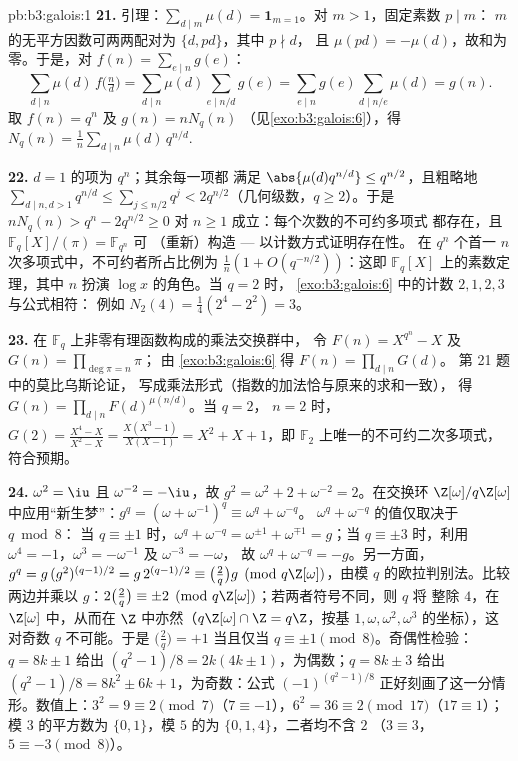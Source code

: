 \begin{solution}{pb:b3:galois:1}
\textbf{21.} 引理：$\sum_{d \mid m}\mu(d) = \mathbf
1_{m=1}$。对 $m > 1$，固定素数 $p \mid m$：
$m$ 的无平方因数可两两配对为 $\{d, pd\}$，其中 $p \nmid d$，
且 $\mu(pd) = -\mu(d)$，故和为零。于是，对 $f(n) =
\sum_{e\mid n}g(e)$：
\[
\sum_{d \mid n}\mu(d)\,f\bigl(\tfrac nd\bigr)
= \sum_{d \mid n}\mu(d)\!\!\sum_{e \mid n/d}\!\!g(e)
= \sum_{e \mid n}g(e)\!\!\sum_{d \mid n/e}\!\!\mu(d)
= g(n) .
\]
取 $f(n) = q^n$ 及 $g(n) = nN_q(n)$
（见\cref{exo:b3:galois:6}），得 $N_q(n) =
\frac1n\sum_{d\mid n}\mu(d)\,q^{n/d}$.

\textbf{22.} $d = 1$ 的项为 $q^n$；其余每一项都
满足 $\abs{\mu(d)q^{n/d}} \leq q^{n/2}$，且粗略地
$\sum_{d \mid n, d > 1}q^{n/d} \leq \sum_{j \leq
n/2}q^j < 2q^{n/2}$（几何级数，$q \geq 2$）。于是 $nN_q(n) >
q^n - 2q^{n/2} \geq 0$ 对 $n \geq 1$ 成立：每个次数的不可约多项式
都存在，且 $\mathbb F_q[X]/(\pi) = \mathbb F_{q^n}$ 可
（重新）构造 --- 以计数方式证明存在性。
在 $q^n$ 个首一 $n$ 次多项式中，不可约者所占比例为
$\frac1n(1 + O(q^{-n/2}))$：这即
$\mathbb F_q[X]$ 上的素数定理，其中 $n$ 扮演 $\log x$ 的角色。当 $q = 2$ 时，
\cref{exo:b3:galois:6} 中的计数 $2, 1, 2, 3$ 与公式相符：
例如 $N_2(4) = \frac14(2^4 - 2^2) = 3$。

\textbf{23.} 在 $\mathbb F_q$ 上非零有理函数构成的乘法交换群中，
令 $F(n) = X^{q^n} -
X$ 及 $G(n) = \prod_{\deg\pi = n}\pi$；
由 \cref{exo:b3:galois:6} 得 $F(n) = \prod_{d\mid n}G(d)$。
第 21 题中的莫比乌斯论证，
写成乘法形式（指数的加法恰与原来的求和一致），
得 $G(n) = \prod_{d \mid n}F(d)^{\mu(n/d)}$。当 $q = 2$，
$n = 2$ 时，$G(2) = \frac{X^4 - X}{X^2 - X} = \frac{X(X^3 -
1)}{X(X - 1)} = X^2 + X + 1$，即
$\mathbb F_2$ 上唯一的不可约二次多项式，符合预期。

\textbf{24.} $\omega^2 = \iu$ 且 $\omega^{-2} = -\iu$，故
$g^2 = \omega^2 + 2 + \omega^{-2} = 2$。在交换环
$\Z[\omega]/q\Z[\omega]$ 中应用“新生梦”：$g^q =
(\omega + \omega^{-1})^q \equiv \omega^q + \omega^{-q}$。
$\omega^q + \omega^{-q}$ 的值仅取决于 $q \bmod 8$：
当 $q \equiv \pm1$ 时，$\omega^q + \omega^{-q} = \omega^{\pm1} +
\omega^{\mp1} = g$；当 $q \equiv \pm3$ 时，利用 $\omega^4 =
-1$，$\omega^{3} = -\omega^{-1}$ 及 $\omega^{-3} = -\omega$，
故 $\omega^q + \omega^{-q} = -g$。另一方面，$g^q =
g\,(g^2)^{(q-1)/2} = g\,2^{(q-1)/2} \equiv \bigl(\frac2q\bigr)
g \pmod{q\Z[\omega]}$，由模 $q$ 的欧拉判别法。比较
两边并乘以 $g$：$2\bigl(\frac2q\bigr) \equiv
\pm2 \pmod{q\Z[\omega]}$；若两者符号不同，则 $q$ 将
整除 $4$，在 $\Z[\omega]$ 中，从而在 $\Z$ 中亦然（$q\Z[\omega] \cap
\Z = q\Z$，按基 $1, \omega, \omega^2,
\omega^3$ 的坐标），这对奇数 $q$ 不可能。于是 $\bigl(\frac2q\bigr) =
+1$ 当且仅当 $q \equiv \pm1 \pmod 8$。奇偶性检验：$q = 8k \pm 1$
给出 $(q^2 - 1)/8 = 2k(4k \pm 1)$，为偶数；$q = 8k \pm 3$
给出 $(q^2 - 1)/8 = 8k^2 \pm 6k + 1$，为奇数：公式
$(-1)^{(q^2-1)/8}$ 正好刻画了这一分情形。数值上：$3^2
= 9 \equiv 2 \pmod 7$（$7 \equiv -1$），$6^2 = 36 \equiv 2
\pmod{17}$（$17 \equiv 1$）；模 $3$ 的平方数为 $\{0,
1\}$，模 $5$ 的为 $\{0, 1, 4\}$，二者均不含 $2$
（$3 \equiv 3$，$5 \equiv -3 \pmod 8$）。


\end{solution}
